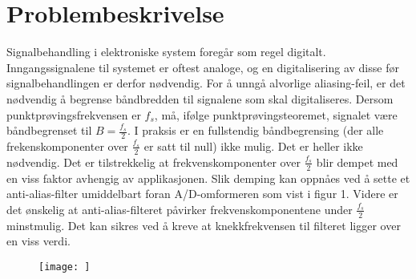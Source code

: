 \section{Problembeskrivelse}
\label{sec:issue}
Signalbehandling i elektroniske system foregår som regel digitalt. Inngangssignalene til systemet er oftest analoge, og en digitalisering av disse før signalbehandlingen er derfor nødvendig. For å unngå alvorlige aliasing-feil, er det nødvendig å begrense båndbredden til signalene som skal digitaliseres. Dersom punktprøvingsfrekvensen er $f_s$, må, ifølge punktprøvingsteoremet, signalet være båndbegrenset til $B = \frac {f_s} {2}$. 
I praksis er en fullstendig båndbegrensing (der alle frekenskomponenter over $\frac {f_s} {2}$ er satt til null) ikke mulig. Det er heller ikke nødvendig. Det er tilstrekkelig at frekvenskomponenter over $\frac {f_s} {2}$ blir dempet med en viss faktor avhengig av applikasjonen. Slik demping kan oppnåes ved å sette et anti-alias-filter umiddelbart foran A/D-omformeren som vist i figur 1.
Videre er det ønskelig at anti-alias-filteret påvirker frekvenskomponentene under $\frac {f_s} {2}$ minstmulig. Det kan sikres ved å kreve at knekkfrekvensen til filteret ligger over en viss verdi.

\begin{figure}
   \texttt{[image: ]} 
\end{figure}